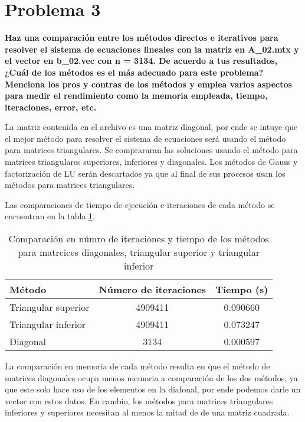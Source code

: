 \section*{Problema 3}

\textbf{Haz una comparación entre los métodos directos e iterativos para resolver el sistema de ecuaciones lineales con la matriz en A\_02.mtx y el vector en b\_02.vec con n = 3134. De acuerdo a tus resultados, ¿Cuál de los métodos es el más adecuado para este problema? Menciona los pros y contras de los métodos y emplea varios aspectos para medir el rendimiento como la memoria empleada, tiempo, iteraciones, error, etc.
}

La matriz contenida en el archivo  es una matriz diagonal, por ende se intuye que el mejor método para resolver el sistema de ecuaciones será usando el método para matrices triangulares. Se comprararan las soluciones usando el método para matrices triangulares superiores, inferiores y diagonales. Los métodos de Gauss y factorización de LU serán descartados ya que al final de sus procesos usan los métodos para matrices triangulares.

Las comparaciones de tiempo de ejecución e iteraciones de cada método se encuentran en la tabla \ref{table:problem3_comparison}.

\begin{table}[H]
    \centering
    \begin{tabular}{lcc} \hline
        \textbf{Método}     & \textbf{Número de iteraciones} & \textbf{Tiempo (s)} \\ \hline
        Triangular superior & 4909411                        & 0.090660            \\
        Triangular inferior & 4909411                        & 0.073247            \\
        Diagonal            & 3134                           & 0.000597            \\ \hline
    \end{tabular}
    \caption{Comparación en númro de iteraciones y tiempo de los métodos para matrcices diagonales, triangular superior y triangular inferior}
    \label{table:problem3_comparison}
\end{table}


La comparación en memoria de cada método resulta en que el método de matrices diagonales ocupa menos memoria a comparación de los dos métodos, ya que este solo hace uso de los elementos en la diafonal, por ende podemos darle un vector con estos datos. En cambio, los métodos para matrices triangulares inferiores y superiores necesitan al menos la mitad de de una matriz cuadrada.